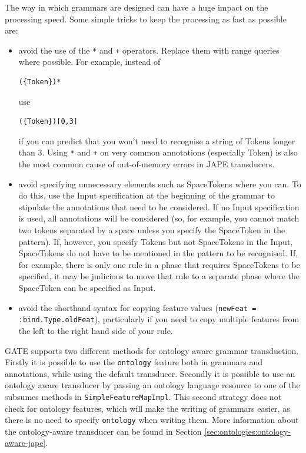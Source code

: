 The way in which grammars are designed can have a huge impact on the
processing speed. Some simple tricks to keep the processing as fast as
possible are:
\begin{itemize}
%
\item avoid the use of the \texttt{*} and \texttt{+} operators. Replace them
  with range queries where possible. For example, instead of
\begin{small}
\begin{verbatim}
({Token})*
\end{verbatim}
\end{small}
 use
\begin{small}
\begin{verbatim}
({Token})[0,3]
\end{verbatim}
\end{small}
if you can predict that you won't need to recognise a
string of Tokens longer than 3.  Using \texttt{*} and \texttt{+} on very common
annotations (especially Token) is also the most common cause of out-of-memory
errors in JAPE transducers.
%
\item
avoid specifying unnecessary elements such as SpaceTokens where you
can.  To do this, use the Input specification at the beginning of the
grammar to stipulate the annotations that need to be considered. If no
Input specification is used, all annotations will be considered (so,
for example, you cannot match two tokens separated by a space unless
you specify the SpaceToken in the pattern). If, however, you specify
Tokens but not SpaceTokens in the Input, SpaceTokens do not have to be
mentioned in the pattern to be recognised. If, for example, there is
only one rule in a phase that requires SpaceTokens to be specified, it
may be judicious to move that rule to a separate phase where the
SpaceToken can be specified as Input.
%
\item
avoid the shorthand syntax for copying feature values ({\small\tt newFeat =
:bind.Type.oldFeat}), particularly if you need to copy multiple features
from the left to the right hand side of your rule.
\end{itemize}

GATE supports two different methods for ontology aware grammar
transduction. Firstly it is possible to use the {\tt ontology}
feature both in grammars and annotations, while using the default
transducer. Secondly it is possible to use an ontology aware
transducer by passing an ontology language
resource to one of the subsumes methods in {\tt SimpleFeatureMapImpl}.
This second strategy does not check for ontology features, which
will make the writing of grammars easier, as there is no need to
specify {\tt ontology} when writing them. More information about
the ontology-aware transducer can be found in
Section \ref{sec:ontologies:ontology-aware-jape}.

